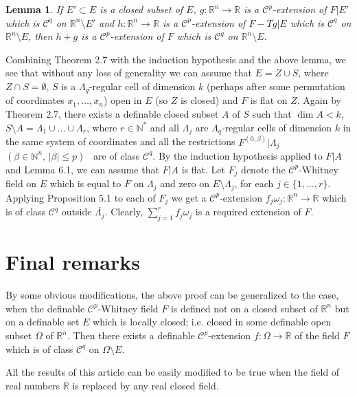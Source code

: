 \documentclass[12pt]{amsart}
\newtheorem{lem}[thm]{Lemma}
\theoremstyle{definition}
\theoremstyle{remark}
\numberwithin{equation}{section}
\newcommand{\Real}{\mathbb R}
\begin{document}
\begin{lem} If $E'\subset E$ is a closed subset of $E$, $g:\Real^n\longrightarrow \Real$ is a $\mathcal{C}^p$-extension of $F|E'$ which is $\mathcal{C}^q$ on $\Real^n\setminus E'$ and $h:\Real^n\longrightarrow \Real$ is a $\mathcal{C}^p$-extension of $F - Tg|E$ which is $\mathcal{C}^q$ on $\Real^n\setminus E$, then $h + g$ is  a $\mathcal{C}^p$-extension of $F$ which is $\mathcal{C}^q$ on $\Real^n\setminus E$.
\end{lem}

Combining Theorem 2.7 with the induction hypothesis and the above lemma, we see that without any loss of generality we can assume that $E = Z\cup S$, where $Z\cap S = \emptyset$, $S$ is a $\varLambda_q$-regular cell of dimension $k$ (perhaps after some permutation of coordinates $x_1,\dots, x_n$) open in $E$ (so $Z$ is closed) and $F$ is flat on $Z$. Again by Theorem 2.7, there exists a definable closed subset $A$ of $S$ such that $\dim A < k$, \, $S\setminus A = \varLambda_1\cup\dots\cup\varLambda_r$, where $r\in\mathbb{N}^{\ast}$ and all $\varLambda_j$ are $\varLambda_q$-regular cells of dimension $k$ in the same system of coordinates and all the restrictions $F^{(0,\beta)}|\varLambda_j$ \, $(\beta\in \mathbb{N}^n, \, |\beta|\leq p)$ \, are of class $\mathcal{C}^q$.
By the induction hypothesis applied to $F|A$ and Lemma 6.1, we can assume that $F|A$ is flat. Let $F_j$ denote the $\mathcal{C}^p$-Whitney field on $E$ which is equal to $F$ on $\varLambda_j$ and zero on $E\setminus \varLambda_j$, for each $j\in\{1,\dots, r\}$. Applying Proposition 5.1 to each of $F_j$ we get a $\mathcal{C}^p$-extension $f_j\omega_j:\Real^n\longrightarrow \Real$ which is of class $\mathcal{C}^q$ outside $\overline{\varLambda_j}$. Clearly, $\sum_{j=1}^rf_j\omega_j$ is a required extension of $F$.

\section{Final remarks}
By some obvious modifications, the above proof can be generalized to the case, when the definable $\mathcal{C}^p$-Whitney field $F$ is defined not on a closed subset of $\Real^n$ but on a definable set $E$ which is locally closed; i.e. closed in some definable open subset $\varOmega$ of $\Real^n$. Then there exists a definable $\mathcal{C}^p$-extension $f:\varOmega\longrightarrow \Real$ of the field $F$ which is of class $\mathcal{C}^q$ on $\varOmega\setminus E$.

\medskip
All the results of this article can be easily modified to be true when the field of real numbers $\Real$ is replaced by any real closed field.
\bigskip
\end{document}
